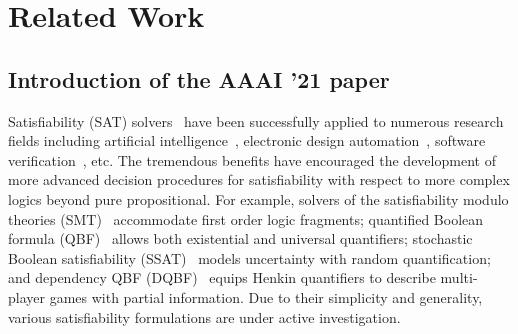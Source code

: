\chapter{Related Work}
\label{chap:related-work}

\iffalse
    with pruning heuristics and subproblem memorization
    For example, \maxplan~\cite{Majercik1998} improves the DPLL-based search by considering pure literal, unit propagation, and subproblem memorization;
    \zander~\cite{Majercik2003} incorporates several threshold pruning heuristics to reduce the search space;
    \dcssat~\cite{Majercik2005} divides the SSAT formulas into many subproblems and conquer them separately.
\fi

\iffalse
    \section{Introduction of the AAAI '21 paper}
    Satisfiability (SAT) solvers~\cite{SATHandbook} have been successfully applied to numerous research fields including artificial intelligence~\cite{Nilsson2014,Russell2020}, electronic design automation~\cite{Marques2000,Wang2009}, software verification~\cite{Jhala2009, Berard2013}, etc.
    The tremendous benefits have encouraged the development of more advanced decision procedures for satisfiability with respect to more complex logics beyond pure propositional.
    For example, solvers of the satisfiability modulo theories (SMT)~\cite{Moura2011,HBMC-SMT} accommodate first order logic fragments; quantified Boolean formula (QBF)~\cite{Narizzano2006,SATHandbook-QBF} allows both existential and universal quantifiers; stochastic Boolean satisfiability (SSAT)~\cite{Littman2001,SATHandbook-SSAT} models uncertainty with random quantification; and dependency QBF (DQBF)~\cite{Balabanov2014,Scholl2018} equips Henkin quantifiers to describe multi-player games with partial information.
    Due to their simplicity and generality, various satisfiability formulations are under active investigation.


